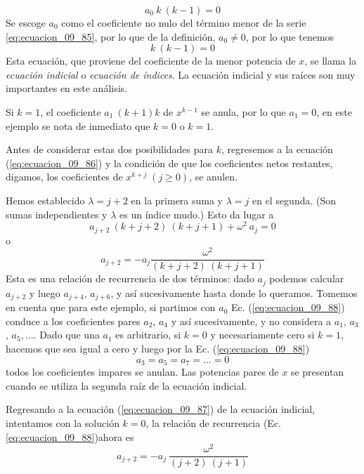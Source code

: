 \[ a_{0} \: k \: (k - 1) = 0 \]
Se escoge $a_{0}$ como el coeficiente no nulo del término menor de la serie \ref{eq:ecuacion_09_85}, por lo que de la definición, $a_{0} \neq 0$, por lo que tenemos
\begin{equation}
 k \: (k - 1) = 0
\label{eq:ecuacion_09_87}
\end{equation}
Esta ecuación, que proviene del coeficiente de la menor potencia de $x$, se llama la \emph{ecuación indicial} o \emph{ecuación de índices}. La ecuación indicial y sus raíces son muy importantes en este análisis.
\par
Si $k = 1$, el coeficiente $a_{1} \: (k + 1)k$ de $x^{k - 1}$ se anula, por lo que $a_{1} = 0$, en este ejemplo se nota de inmediato que $k = 0$ o $k = 1$.
\par
Antes de considerar estas dos posibilidades para $k$, regresemos a la ecuación (\ref{eq:ecuacion_09_86}) y la condición de que los coeficientes netos restantes, digamos, los coeficientes de $x^{k + j} \; (j \geq 0)$, se anulen.
\par
Hemos establecido $ \lambda = j + 2$ en la primera suma y $\lambda = j$ en el segunda. (Son sumas independientes y $\lambda$ es un índice mudo.) Esto da lugar a
\[ a_{j + 2} \: (k + j + 2) \: (k + j + 1) + \omega^{2} \: a_{j} = 0 \]
o
\begin{equation}
a_{j + 2} = - a_{j} \dfrac{\omega^{2}}{(k + j + 2) \: (k + j + 1)}
\label{eq:ecuacion_09_88}
\end{equation}
Esta es una relación de recurrencia de dos términos: dado $a_{j}$ podemos calcular $a_{j + 2}$ y luego $a_{j + 4}$, $a_{j + 6}$, y así sucesivamente hasta donde lo queramos. Tomemos en cuenta que para este ejemplo, si partimos con $a_{0}$ Ec. (\ref{eq:ecuacion_09_88}) conduce a los coeficientes pares $a_{2}$, $a_{4}$ y así sucesivamente, y no considera a $a_{1}$, $a_{3}$, $a_{5}, \ldots$. Dado que una $a_{1}$ es arbitrario, si $k = 0$ y necesariamente cero si $k = 1$, hacemos que sea igual a cero  y luego por la Ec. (\ref{eq:ecuacion_09_88})
\[ a_{3} = a_{5} = a_{7} = \ldots = 0 \]
todos los coeficientes impares se anulan. Las potencias pares de $x$ se presentan cuando se utiliza la segunda raíz de la ecuación indicial.
\par
Regresando a la ecuación (\ref{eq:ecuacion_09_87}) de la ecuación indicial, intentamos con la solución $k = 0$, la relación de recurrencia (Ec. \ref{eq:ecuacion_09_88})ahora es
\begin{equation}
a_{j + 2} = - a_{j} \: \dfrac{\omega^{2}}{(j+2) \:(j+1)}
\label{eq:ecuacion_09_89}
\end{equation}
